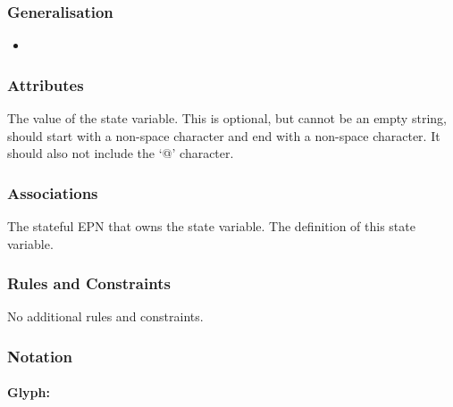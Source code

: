 \subsubsection{Generalisation}

\begin{itemize}
\item {}
\end{itemize}

\subsubsection{Attributes}

\begin{attributes}
   The value of the state variable. This is
  optional, but cannot be an empty string, should start with a
  non-space character and end with a non-space character. It should
  also not include the `@' character.
\end{attributes}

\subsubsection{Associations}

\begin{attributes}
    The stateful EPN that owns
  the state variable.
   The definition of
  this state variable.
\end{attributes}

\subsubsection{Rules and Constraints}

No additional rules and constraints.

\subsubsection{Notation}


\paragraph{Glyph: }
\label{sec:techref:stateVariable}


